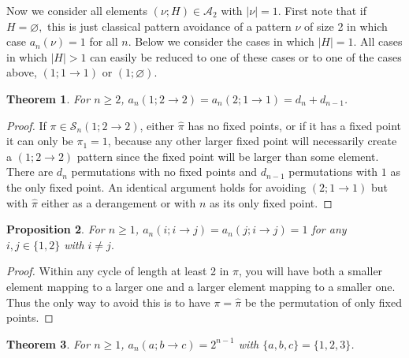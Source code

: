 \documentclass[11pt]{article}
\renewcommand\S{\mathcal S}
\newcommand\A{\mathcal A}
\newtheorem{theorem}{Theorem}[section]
\newtheorem{proposition}[theorem]{Proposition}
\theoremstyle{definition}
\begin{document}
Now we consider all elements $(\nu; H)\in\A_2$ with $|\nu|=1$. First note that if $H=\varnothing,$
this is just classical pattern avoidance of a pattern $\nu$ of size 2 in which case $a_n(\nu) = 1$ for all $n$. Below we consider the cases in which $|H|=1$. All cases in which $|H|> 1$ can easily be reduced to one of these cases or to one of the cases above, $(1;1\to1)$ or $(1;\varnothing)$.


\begin{theorem}\label{thm:1 2 to 2}
    For $n \geq 2$, $a_n(1; 2 \to 2) = a_n(2;1 \to 1) = d_n + d_{n-1}$. %
\end{theorem}

\begin{proof}
    If $\pi \in \S_n(1; 2 \to 2)$, either $\hat\pi$ has no fixed points, or if it has a fixed point it can only be $\pi_1 = 1$, because any other larger fixed point will necessarily create a $(1; 2 \to 2)$ pattern since the fixed point will be larger than some element. There are $d_n$ permutations with no fixed points and $d_{n-1}$ permutations with $1$ as the only fixed point. An identical argument holds for avoiding $(2; 1\to1)$ but with $\hat\pi$ either as a derangement or with $n$ as its only fixed point.
\end{proof}

\begin{proposition}\label{prop: i i to j}
    For $n \geq 1$, $a_n(i; i\to j) =a_n(j; i\to j) = 1$ for any $i,j\in\{1,2\}$ with $i\neq j.$
\end{proposition}

\begin{proof}
    Within any cycle of length at least 2 in $\hat\pi$, you will have both a smaller element mapping to a larger one and a larger element mapping to a smaller one. Thus the only way to avoid this is to have $\pi=\hat\pi$ be the permutation of only fixed points.
\end{proof}


\begin{theorem} \label{thm:atbc}
    For $n \geq 1$, $a_n(a;b \to c) = 2^{n-1}$ with $\{a,b,c\} =  \{1,2,3\}$.
\end{theorem}
\end{document}
